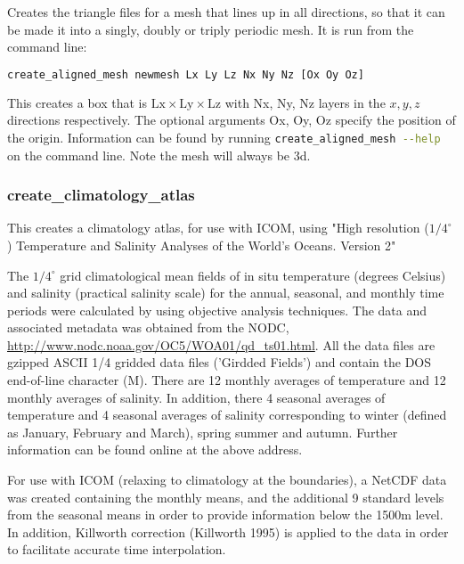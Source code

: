 Creates the triangle files for a mesh that lines up in all directions, so that it can be made it into a singly, doubly or triply periodic mesh. It is run from the command line:

\begin{lstlisting}[language = Bash]
create_aligned_mesh newmesh Lx Ly Lz Nx Ny Nz [Ox Oy Oz]
\end{lstlisting}

This creates a box that is $\mathrm{Lx} \times \mathrm{Ly} \times \mathrm{Lz}$ with Nx, Ny, Nz layers in the $x,y,z$ directions respectively. The optional arguments Ox, Oy, Oz  specify the position of the origin. Information can be found by running \lstinline[language = bash]+create_aligned_mesh --help+ on the command line. Note the mesh will always be 3d.


\subsubsection{create\_climatology\_atlas}
\label{sec:create_climatology_atlas}

This creates a climatology atlas, for use with ICOM, using "High resolution ($1/4 ^\circ$) Temperature and Salinity Analyses of the World's Oceans. Version 2"

The $1/4 ^\circ$ grid climatological mean fields of in situ temperature (degrees Celsius) and salinity (practical salinity scale) for the annual, seasonal, and monthly time periods were calculated by \cite{boyer2005} using objective analysis techniques. The data and associated metadata was obtained from the NODC, \url{http://www.nodc.noaa.gov/OC5/WOA01/qd_ts01.html}. All the data files are gzipped ASCII 1/4 gridded data files ('Girdded Fields') and contain the DOS end-of-line character (M). There are 12 monthly averages of temperature and 12 monthly averages of salinity. In addition, there 4 seasonal averages of temperature and 4 seasonal averages of salinity corresponding to winter (defined as January, February and March), spring summer and autumn. Further information can be found online at the above address.

For use with ICOM (relaxing to climatology at the boundaries), a NetCDF data was created containing the monthly means, and the additional 9 standard levels from the seasonal means in order to provide information below the 1500m level. In addition, Killworth correction (Killworth 1995) is applied to the data in order to facilitate accurate time interpolation.

